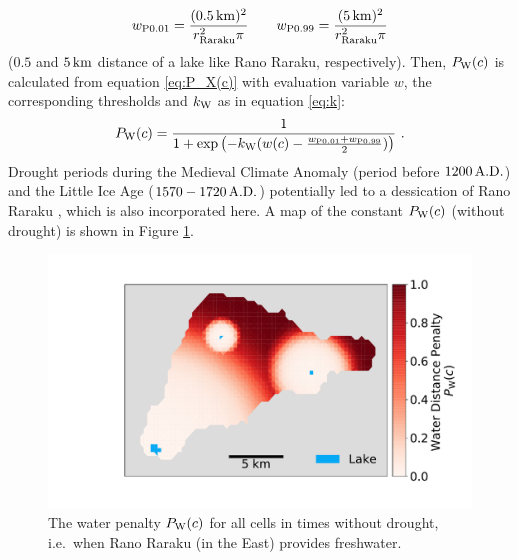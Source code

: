 \begin{equation}
w_{\rm P0.01} = \frac{(0.5\, {\rm km})^2}{r_\text{Raraku}^2\pi} \qquad
 w_{\rm P0.99}=\frac{(5\, {\rm km})^2}{r_\text{Raraku}^2\pi}
\end{equation} 
($0.5$ and $5\, {\rm km}$ distance of a lake like Rano Raraku, respectively).
Then, $P_{\rm W}(c)$ is calculated from equation \ref{eq:P_X(c)} with evaluation variable $w$, the corresponding thresholds and $k_{\rm W}$ as in equation \ref{eq:k}:
\begin{equation}
	P_{\rm W}(c) = \frac{1}{1+\exp\left( - k_{\rm W} (w(c)-\frac{w_{\rm P0.01}+w_{\rm P0.99}}{2}) \right)} \ .
\end{equation}
Drought periods during the Medieval Climate Anomaly (period before $1200\, {\rm A.D.}$) and the Little Ice Age ($1570-1720 \, {\rm A.D.}$) potentially led to a dessication of Rano Raraku \citep{Rull2020}, which is also incorporated here. 
A map of the constant $P_{\rm W}(c)$ (without drought) is shown in Figure \ref{fig:plotpw}. 
\begin{figure}
	\centering
	\includegraphics[width=1\linewidth]{images/Plot_PW}
	\caption{The water penalty $P_{\rm W}(c)$ for all cells in times without drought, i.e.\ when Rano Raraku (in the East) provides freshwater.}
	\label{fig:plotpw}
\end{figure}


